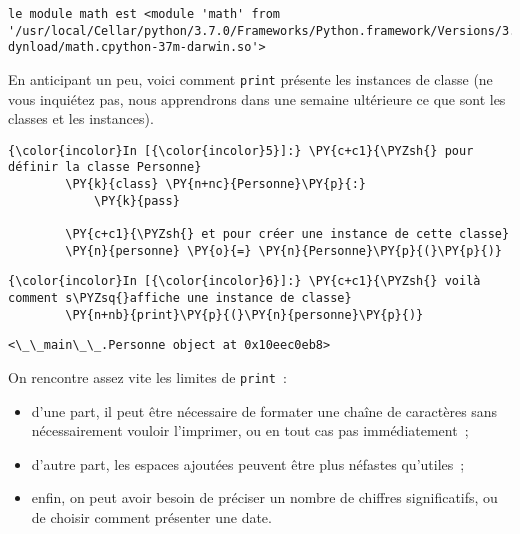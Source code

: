     \begin{Verbatim}[commandchars=\\\{\},frame=single,framerule=0.3mm,rulecolor=\color{cellframecolor}]
le module math est <module 'math' from '/usr/local/Cellar/python/3.7.0/Frameworks/Python.framework/Versions/3.7/lib/python3.7/lib-dynload/math.cpython-37m-darwin.so'>
\end{Verbatim}

    En anticipant un peu, voici comment \texttt{print} présente les
instances de classe (ne vous inquiétez pas, nous apprendrons dans une
semaine ultérieure ce que sont les classes et les instances).

    \begin{Verbatim}[commandchars=\\\{\},frame=single,framerule=0.3mm,rulecolor=\color{cellframecolor}]
{\color{incolor}In [{\color{incolor}5}]:} \PY{c+c1}{\PYZsh{} pour définir la classe Personne}
        \PY{k}{class} \PY{n+nc}{Personne}\PY{p}{:}
            \PY{k}{pass}
        
        \PY{c+c1}{\PYZsh{} et pour créer une instance de cette classe}
        \PY{n}{personne} \PY{o}{=} \PY{n}{Personne}\PY{p}{(}\PY{p}{)}
\end{Verbatim}


    \begin{Verbatim}[commandchars=\\\{\},frame=single,framerule=0.3mm,rulecolor=\color{cellframecolor}]
{\color{incolor}In [{\color{incolor}6}]:} \PY{c+c1}{\PYZsh{} voilà comment s\PYZsq{}affiche une instance de classe}
        \PY{n+nb}{print}\PY{p}{(}\PY{n}{personne}\PY{p}{)}
\end{Verbatim}


    \begin{Verbatim}[commandchars=\\\{\},frame=single,framerule=0.3mm,rulecolor=\color{cellframecolor}]
<\_\_main\_\_.Personne object at 0x10eec0eb8>
\end{Verbatim}

    On rencontre assez vite les limites de \texttt{print}~:

\begin{itemize}
\tightlist
\item
  d'une part, il peut être nécessaire de formater une chaîne de
  caractères sans nécessairement vouloir l'imprimer, ou en tout cas pas
  immédiatement~;
\item
  d'autre part, les espaces ajoutées peuvent être plus néfastes
  qu'utiles~;
\item
  enfin, on peut avoir besoin de préciser un nombre de chiffres
  significatifs, ou de choisir comment présenter une date.
\end{itemize}


